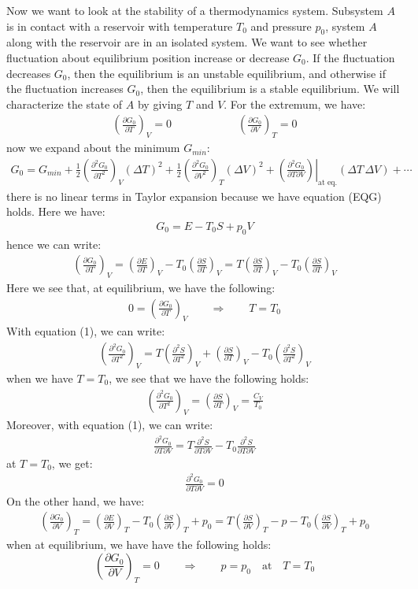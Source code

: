 \documentclass[11pt,oneside]{book}
\theoremstyle{break}
\theoremstyle{break}
\newcommand{\pd}{\partial}
\newcommand{\lr}[1]{\left( #1 \right)}
\begin{document}
Now we want to look at the stability of a thermodynamics system. Subsystem $A$ is in contact with a reservoir with temperature $T_0$ and pressure $p_0$, system $A$ along with the reservoir are in an isolated system. We want to see whether fluctuation about equilibrium position increase or decrease $G_0$. If the fluctuation decreases $G_0$, then the equilibrium is an unstable equilibrium, and otherwise if the fluctuation increases $G_0$, then the equilibrium is a stable equilibrium. We will characterize the state of $A$ by giving $T$ and $V$. For the extremum, we have:
\begin{align*}
\lr{\frac{\partial G_0}{\pd T}}_V  = 0 \qquad\qquad\qquad \lr{\frac{\pd G_0}{\pd V}}_T = 0 \tag{EQG}
\end{align*}
now we expand about the minimum $G_{min}$:
\begin{align*}
G_0 = G_{min} + \frac{1}{2}\lr{\frac{\partial^2 G_0}{\partial T^2}}_V \lr{\Delta T}^2 +  \frac{1}{2}\lr{\frac{\partial^2 G_0}{\partial V^2}}_T \lr{\Delta V}^2 + \left.\lr{\frac{\partial^2 G_0}{\pd T \pd V}}\right|_{\text{at eq.}}\lr{\Delta T \,\Delta V} + \cdots
\end{align*}
there is no linear terms in Taylor expansion because we have equation (EQG) holds. Here we have:
\begin{align*}
G_0 = E - T_0 S + p_0 V
\end{align*}
hence we can write:
\begin{align*}
 \lr{\frac{\pd G_0}{\pd T}}_V = \lr{\frac{\pd E}{\pd T}}_V -T_0 \lr{\frac{\pd S}{\pd T}}_V = T\lr{\frac{\pd S}{\pd T}}_V - T_0 \lr{\frac{\pd S}{\pd T}}_V \tag{1}
\end{align*}
Here we see that, at equilibrium, we have the following:
\begin{align*}
0 = \lr{\frac{\pd G_0}{\pd T}}_V \qquad \Rightarrow \qquad T = T_0
\end{align*}
With equation (1), we can write:
\begin{align*}
\lr{\frac{\pd^2 G_0}{\pd T^2}}_V = T\lr{\frac{\pd^2 S}{\pd T^2}}_V + \lr{\frac{\pd S}{\pd T}}_V - T_0 \lr{\frac{\pd^2S}{\pd T^2}}_V
\end{align*}
when we have $T = T_0$, we see that we have the following holds:
\begin{align*}
\lr{\frac{\pd^2 G_0}{\pd T^2}}_V  = \lr{\frac{\pd S}{\pd T}}_V = \frac{C_V}{T_0}
\end{align*}
Moreover, with equation (1), we can write:
\begin{align*}
\frac{\pd^2 G_0}{\pd T \pd V} = T \frac{\pd^2 S}{\pd T \pd V} - T_0 \frac{\pd^2 S}{\pd T \pd V} 
\end{align*}
at $T = T_0$, we get:
\begin{align*}
\frac{\pd^2 G_0}{\pd T \pd V} = 0
\end{align*}
On the other hand, we have:
\begin{align*}
\lr{\frac{\pd G_0}{\pd V}}_T = \lr{\frac{\pd E}{\pd V}}_T - T_0 \lr{\frac{\pd S}{\pd V}}_T + p_0 = T\lr{\frac{\pd S}{\pd V}}_T - p - T_0 \lr{\frac{\pd S}{\pd V}}_T + p_0
\end{align*}
when at equilibrium, we have have the following holds:
$$\lr{\frac{\pd G_0}{\pd V}}_T = 0 \qquad\Rightarrow\qquad p= p_0 \quad \text{at}\quad T = T_0$$ 
\end{document}

